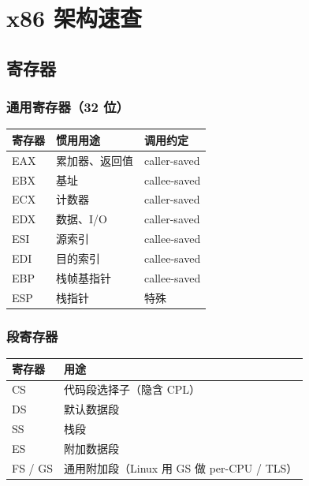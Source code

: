 \chapter{x86 架构速查}
\label{ch:appendix-x86-ref}

\section{寄存器}

\subsection{通用寄存器（32 位）}

\begin{longtable}{lll}
  \toprule
  \textbf{寄存器} & \textbf{惯用用途} & \textbf{调用约定} \\
  \midrule
  EAX & 累加器、返回值    & caller-saved \\
  EBX & 基址             & callee-saved \\
  ECX & 计数器           & caller-saved \\
  EDX & 数据、I/O        & caller-saved \\
  ESI & 源索引           & callee-saved \\
  EDI & 目的索引         & callee-saved \\
  EBP & 栈帧基指针       & callee-saved \\
  ESP & 栈指针           & 特殊 \\
  \bottomrule
\end{longtable}

\subsection{段寄存器}

\begin{longtable}{ll}
  \toprule
  \textbf{寄存器} & \textbf{用途} \\
  \midrule
  CS & 代码段选择子（隐含 CPL） \\
  DS & 默认数据段 \\
  SS & 栈段 \\
  ES & 附加数据段 \\
  FS / GS & 通用附加段（Linux 用 GS 做 per-CPU / TLS） \\
  \bottomrule
\end{longtable}

